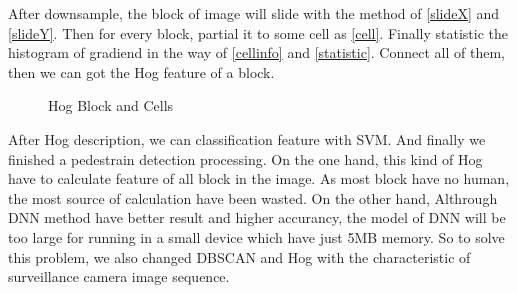\documentclass[12pt]{article}
\theoremstyle{plain}
\begin{document}
After downsample, the block of image will slide with the method of \ref{slideX} and \ref{slideY}. Then for every block, partial it to some cell as \ref{cell}. Finally statistic the histogram of gradiend in the way of \ref{cellinfo} and \ref{statistic}. Connect all of them, then we can got the Hog feature of a block.


\begin{figure}[H]
\centering
\begin{multicols}{2}
\end{multicols}


\begin{multicols}{2}
\end{multicols}



\caption{Hog Block and Cells}
\end{figure}

After Hog description, we can classification feature with SVM. And finally we finished a pedestrain detection processing.
On the one hand, this kind of Hog have to calculate feature of all block in the image. As most block have no human, the most source of calculation have been wasted.
On the other hand, Althrough DNN method have better result and higher accurancy, the model of DNN will be too large for running in a small device which have just 5MB memory.
So to solve this problem, we also changed DBSCAN and Hog with the characteristic of surveillance camera image sequence.
\end{document}
